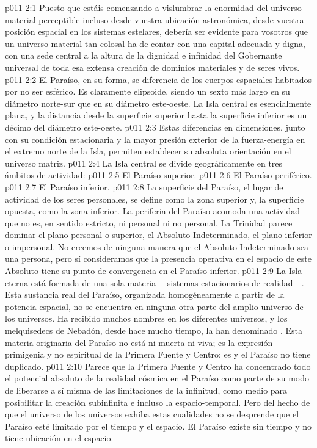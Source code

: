 \vs p011 2:1 Puesto que estáis comenzando a vislumbrar la enormidad del universo material perceptible incluso desde vuestra ubicación astronómica, desde vuestra posición espacial en los sistemas estelares, debería ser evidente para vosotros que un universo material tan colosal ha de contar con una capital adecuada y digna, con una sede central a la altura de la dignidad e infinidad del Gobernante universal de toda esa extensa creación de dominios materiales y de seres vivos.
\vs p011 2:2 \pc El Paraíso, en su forma, se diferencia de los cuerpos espaciales habitados por no ser esférico. Es claramente elipsoide, siendo un sexto más largo en su diámetro norte\hyp{}sur que en su diámetro este\hyp{}oeste. La Isla central es esencialmente plana, y la distancia desde la superficie superior hasta la superficie inferior es un décimo del diámetro este\hyp{}oeste.
\vs p011 2:3 Estas diferencias en dimensiones, junto con su condición estacionaria y la mayor presión exterior de la fuerza\hyp{}energía en el extremo norte de la Isla, permiten establecer su absoluta orientación en el universo matriz.
\vs p011 2:4 \pc La Isla central se divide geográficamente en tres ámbitos de actividad:
\vs p011 2:5 El Paraíso superior.
\vs p011 2:6 El Paraíso periférico.
\vs p011 2:7 El Paraíso inferior.
\vs p011 2:8 \pc La superficie del Paraíso, el lugar de actividad de los seres personales, se define como la zona superior y, la superficie opuesta, como la zona inferior. La periferia del Paraíso acomoda una actividad que no es, en sentido estricto, ni personal ni no personal. La Trinidad parece dominar el plano personal o superior, el Absoluto Indeterminado, el plano inferior o impersonal. No creemos de ninguna manera que el Absoluto Indeterminado sea una persona, pero sí consideramos que la presencia operativa en el espacio de este Absoluto tiene su punto de convergencia en el Paraíso inferior.
\vs p011 2:9 \pc La Isla eterna está formada de una sola materia ---sistemas estacionarios de realidad---. Esta sustancia real del Paraíso, organizada homogéneamente a partir de la potencia espacial, no se encuentra en ninguna otra parte del amplio universo de los universos. Ha recibido muchos nombres en los diferentes universos, y los melquisedecs de Nebadón, desde hace mucho tiempo, la han denominado . Esta materia originaria del Paraíso no está ni muerta ni viva; es la expresión primigenia y no espiritual de la Primera Fuente y Centro; es  y el Paraíso no tiene duplicado.
\vs p011 2:10 Parece que la Primera Fuente y Centro ha concentrado todo el potencial absoluto de la realidad cósmica en el Paraíso como parte de su modo de liberarse a sí misma de las limitaciones de la infinitud, como medio para posibilitar la creación subinfinita e incluso la espacio\hyp{}temporal. Pero del hecho de que el universo de los universos exhiba estas cualidades no se desprende que el Paraíso esté limitado por el tiempo y el espacio. El Paraíso existe sin tiempo y no tiene ubicación en el espacio.
